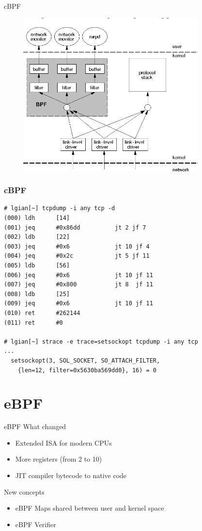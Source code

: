 \documentclass{beamer}
\begin{document}
\begin{frame}{cBPF}
  \begin{figure}
    \includegraphics[width=0.85\textwidth]{./cbpf.png}
  \end{figure}
\end{frame}

\begin{frame}[fragile]
  \frametitle{cBPF}
  \begin{verbatim}
# lgian[~] tcpdump -i any tcp -d
(000) ldh      [14]
(001) jeq      #0x86dd          jt 2 jf 7
(002) ldb      [22]
(003) jeq      #0x6             jt 10 jf 4
(004) jeq      #0x2c            jt 5 jf 11
(005) ldb      [56]
(006) jeq      #0x6             jt 10 jf 11
(007) jeq      #0x800           jt 8  jf 11
(008) ldb      [25]
(009) jeq      #0x6             jt 10 jf 11
(010) ret      #262144
(011) ret      #0

# lgian[~] strace -e trace=setsockopt tcpdump -i any tcp
...
  setsockopt(3, SOL_SOCKET, SO_ATTACH_FILTER, 
    {len=12, filter=0x5630ba569dd0}, 16) = 0
  \end{verbatim}
\end{frame}

\section{eBPF}
\begin{frame}{eBPF}
  What changed
  \begin{itemize}
    \item Extended ISA for modern CPUs
    \item More registers (from 2 to 10)
    \item JIT compiler bytecode to native code
  \end{itemize}

  New concepts
  \begin{itemize}
    \item eBPF Maps shared between user and kernel space
    \item eBPF Verifier
  \end{itemize}
\end{frame}
\end{document}
